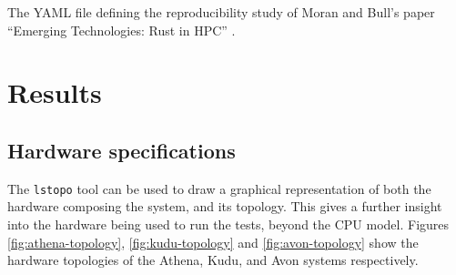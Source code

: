 \begin{listing}[H]
    \caption{The YAML file defining the reproducibility study of Moran and Bull's paper ``Emerging Technologies: Rust in HPC'' \cite{moranEmergingTechnologiesRust2023}.}
    \label{listing:athena-lscpu}
\end{listing}





\chapter{Results}
\label{ch:results-appendix}

\section{Hardware specifications}
\label{sec:hardware-specifications}

The \texttt{lstopo} tool can be used to draw a graphical representation of both the hardware composing the system, and its topology. This gives a further insight into the hardware being used to run the tests, beyond the CPU model. Figures \ref{fig:athena-topology}, \ref{fig:kudu-topology} and \ref{fig:avon-topology} show the hardware topologies of the Athena, Kudu, and Avon systems respectively.

